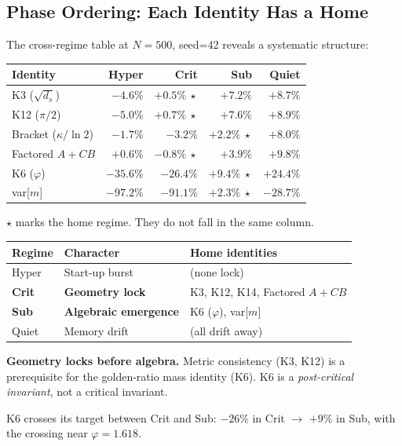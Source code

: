 \documentclass[12pt, a4paper]{article}
\begin{document}
\subsection{Phase Ordering: Each Identity Has a Home}

\begin{keybox}[title={Phase Hierarchy Confirmed (V21.2, v2 Diagnosis)}]
The cross-regime table at $N=500$, seed=42 reveals a systematic structure:

\begin{center}
\renewcommand{\arraystretch}{1.2}
\begin{tabular}{p{3.5cm} r r r r}
\toprule
\textbf{Identity} & \textbf{Hyper} & \textbf{Crit} & \textbf{Sub} & \textbf{Quiet} \\
\midrule
K3 ($\sqrt{d_s}$) & $-4.6\%$ & $+0.5\%\ \star$ & $+7.2\%$ & $+8.7\%$ \\
K12 ($\pi/2$) & $-5.0\%$ & $+0.7\%\ \star$ & $+7.6\%$ & $+8.9\%$ \\
Bracket ($\kappa/\ln 2$) & $-1.7\%$ & $-3.2\%$ & $+2.2\%\ \star$ & $+8.0\%$ \\
Factored $A+CB$ & $+0.6\%$ & $-0.8\%\ \star$ & $+3.9\%$ & $+9.8\%$ \\
K6 ($\varphi$) & $-35.6\%$ & $-26.4\%$ & $+9.4\%\ \star$ & $+24.4\%$ \\
var[$m$] & $-97.2\%$ & $-91.1\%$ & $+2.3\%\ \star$ & $-28.7\%$ \\
\bottomrule
\end{tabular}
\end{center}

$\star$ marks the home regime. They do not fall in the same column.

\begin{center}
\renewcommand{\arraystretch}{1.2}
\begin{tabular}{p{3cm} p{3.5cm} p{5cm}}
\toprule
\textbf{Regime} & \textbf{Character} & \textbf{Home identities} \\
\midrule
Hyper & Start-up burst & (none lock) \\
\textbf{Crit} & \textbf{Geometry lock} & K3, K12, K14, Factored $A+CB$ \\
\textbf{Sub} & \textbf{Algebraic emergence} & K6 ($\varphi$), var[$m$] \\
Quiet & Memory drift & (all drift away) \\
\bottomrule
\end{tabular}
\end{center}

\textbf{Geometry locks before algebra.} Metric consistency (K3, K12) is a prerequisite for the golden-ratio mass identity (K6). K6 is a \emph{post-critical invariant}, not a critical invariant.

K6 crosses its target between Crit and Sub: $-26\%$ in Crit $\to$ $+9\%$ in Sub, with the crossing near $\varphi = 1.618$.
\end{keybox}
\end{document}
